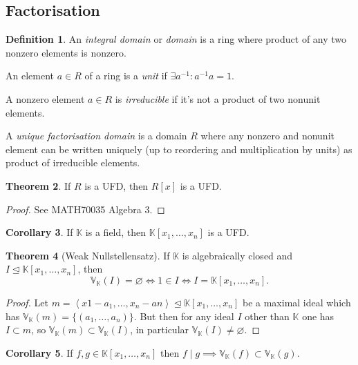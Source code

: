 \documentclass{article}
\newcommand{\K}{\mathbb{K}}
\newcommand{\V}{\mathbb{V}}
\newcommand{\la}{\left\langle}
\newcommand{\ra}{\right\rangle}
\theoremstyle{definition}
\newtheorem{defn}{Definition}[subsection]
\newtheorem{thm}[defn]{Theorem}
\newtheorem{coro}[defn]{Corollary}
\begin{document}
\subsection{Factorisation}
\begin{defn}
An \textit{integral domain} or \textit{domain} is a ring where product of any two nonzero elements is nonzero.

An element $a\in R$ of a ring is a \textit{unit} if $\exists a^{-1}:a^{-1}a=1$.

A nonzero element $a\in R$ is \textit{irreducible} if it's not a product of two nonunit elements.

A \textit{unique factorisation domain} is a domain $R$ where any nonzero and nonunit element can be written uniquely (up to reordering and multiplication by units) as product of irreducible elements.
\end{defn}

\begin{thm}
If $R$ is a UFD, then $R[x]$ is a UFD.
\end{thm}
\begin{proof}
See MATH70035 Algebra 3.
\end{proof}

\begin{coro}
\label{coro:KfieldKxUFD}
If $\K$ is a field, then $\K[x_1,\ldots,x_n]$ is a UFD.
\end{coro}

\begin{thm}[Weak Nullstellensatz]
\label{thm:weak0stellensatz}
If $\K$ is algebraically closed and $I\unlhd\K[x_1,\ldots,x_n]$, then
\[
\V_\K(I)=\varnothing\iff 1\in I\iff I=\K[x_1,\ldots,x_n].
\]
\end{thm}
\begin{proof}
Let $m=\la x1-a_1,\ldots,x_n-an\ra\unlhd\K[x_1,\ldots,x_n]$ be a maximal ideal which has $\V_\K(m)=\{(a_1,\ldots,a_n)\}$. But then for any ideal $I$ other than $\K$ one has $I\subset m$, so $\V_\K(m)\subset\V_\K(I)$, in particular $\V_\K(I)\neq\varnothing$.
\end{proof}

\begin{coro}
\label{coro:fdivgthenVfinVg}
If $f,g\in \K[x_1,\ldots,x_n]$ then $f\mid g\implies \V_\K(f)\subset\V_\K(g)$.
\end{coro}
\end{document}
